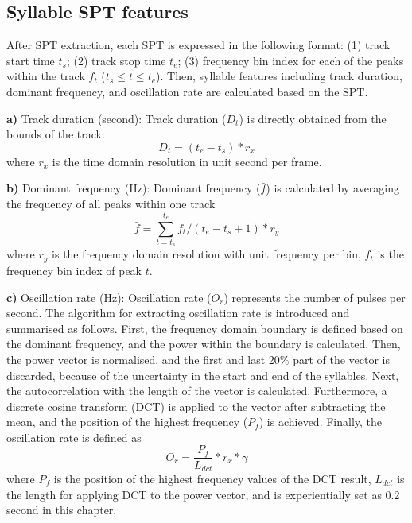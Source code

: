 \subsection{Syllable SPT features}

After SPT extraction, each SPT is expressed in the following format: (1) track start time $t_{s}$; (2) track stop time $t_{e}$; (3) frequency bin index for each of the peaks within the track $f_{t}$ ($t_{s} \leq t \leq t_{e}$).  Then, syllable features including track duration, dominant frequency, and oscillation rate are calculated based on the SPT.

\noindent \textbf{a)} Track duration (second):
Track duration ($D_{t}$) is directly obtained from the bounds of the track.
\begin{equation}
D_{t} = (t_{e}-t_{s})*r_{x}
\end{equation}
\noindent where $r_{x}$ is the time domain resolution in unit second per frame.

\noindent \textbf{b)} Dominant frequency (Hz): 
Dominant frequency ($\bar{f}$) is calculated by averaging the frequency of all peaks within one track
\begin{equation}
\bar{f} = \sum_{t=t_{s}}^{t_{e}}f_{t}/(t_{e}-t_{s}+1)*r_{y}
\end{equation}
where $r_{y}$ is the frequency domain resolution with unit frequency per bin, $f_{t}$ is the frequency bin index of peak $t$.

\noindent  \textbf{c)} Oscillation rate (Hz):  
Oscillation rate ($O_{r}$) represents the number of pulses per second. The algorithm for extracting oscillation rate is introduced and summarised as follows.
First, the frequency domain boundary is defined based on the dominant frequency, and the power within the boundary is calculated. Then, the power vector is normalised, and the first and last 20\% part of the vector is discarded, because of the uncertainty in the start and end of the syllables. Next, the autocorrelation with the length of the vector is calculated. Furthermore, a discrete cosine transform (DCT) is applied to the vector after subtracting the mean, and the position of the highest frequency ($P_{f}$) is achieved. Finally, the oscillation rate is defined as
\begin{equation}
O_{r}= \frac{P_{f}}{L_{dct}}*r_{x}*\gamma
\end{equation}
\noindent where $P_{f}$ is the position of the highest frequency values of the DCT result, $L_{dct}$ is the length for applying DCT to the power vector, and is experientially set as 0.2 second in this chapter. 



